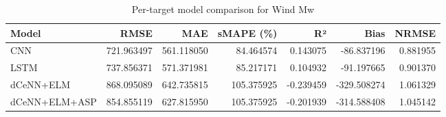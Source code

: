 \begin{table}
\caption{Per-target model comparison for Wind Mw}
\begin{tabular}{lrrrrrr}
\toprule
Model & RMSE & MAE & sMAPE (\%) & R² & Bias & NRMSE \\
\midrule
CNN & 721.963497 & 561.118050 & 84.464574 & 0.143075 & -86.837196 & 0.881955 \\
LSTM & 737.856371 & 571.371981 & 85.217171 & 0.104932 & -91.197665 & 0.901370 \\
dCeNN+ELM & 868.095089 & 642.735815 & 105.375925 & -0.239459 & -329.508274 & 1.061329 \\
dCeNN+ELM+ASP & 854.855119 & 627.815950 & 105.375925 & -0.201939 & -314.588408 & 1.045142 \\
\bottomrule
\end{tabular}
\end{table}
